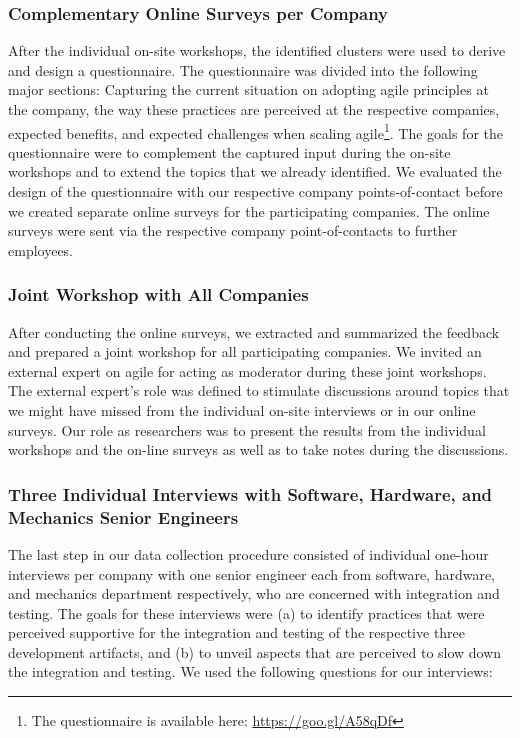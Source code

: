\documentclass[10pt,a4paper]{IEEEtran} %
\begin{document}
\subsubsection{Complementary Online Surveys per Company}

After the individual on-site workshops, the identified clusters were used
to derive and design a questionnaire. The questionnaire was divided into the
following major sections: Capturing the current situation on adopting agile
principles at the company, the way these practices are perceived at the
respective companies, expected benefits, and expected challenges when scaling
agile\footnote{The questionnaire is available here: \url{https://goo.gl/A58qDf}}.
The goals for the questionnaire were to complement the captured input during
the on-site workshops and to extend the topics that we already identified.
We evaluated the design of the questionnaire with our respective company
points-of-contact before we created separate online surveys for the participating
companies. The online surveys were sent via the respective company
point-of-contacts to further employees.

\subsubsection{Joint Workshop with All Companies}

After conducting the online surveys, we extracted and summarized the feedback
and prepared a joint workshop for all participating companies. We invited an external expert on agile for acting as moderator during these joint workshops.
The external expert's role was defined to stimulate discussions around topics that we might have missed from the individual on-site interviews or in our
online surveys. 
Our role as researchers was to present the results
from the individual workshops and the on-line surveys as well as to take notes
during the discussions.

\subsubsection{Three Individual Interviews with Software, Hardware, and Mechanics Senior Engineers}

The last step in our data collection procedure consisted of individual one-hour interviews per company with one senior engineer each from software, hardware, and mechanics department respectively, who are concerned with
integration and testing.
The goals for these interviews were (a) to identify practices that were perceived supportive for the integration and testing of the respective
three development artifacts, and (b) to unveil aspects that are perceived to slow down the integration and testing. We used the following questions for our
interviews:
\end{document}
